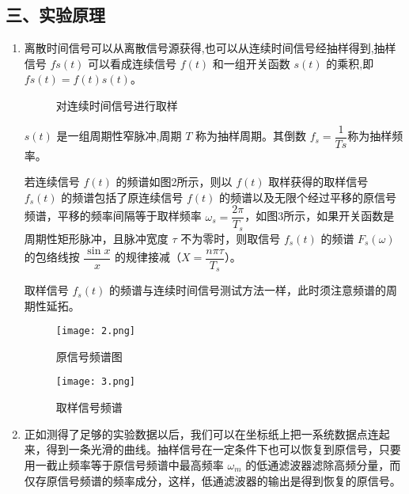 \documentclass[dvipsnames, svgnames,a4paper,11pt]{article}
\begin{document}
\subsection*{三、实验原理}
\begin{enumerate}
  \item 离散时间信号可以从离散信号源获得,也可以从连续时间信号经抽样得到,抽样信号 $fs(t)$ 可以看成连续信号 $f(t)$ 和一组开关函数 $s(t)$ 的乘积,即 $fs(t)= f(t) s(t)$。
  
  \begin{figure}[htbp]
    \centering
    \caption{对连续时间信号进行取样}
  \end{figure}


  $s(t)$ 是一组周期性窄脉冲,周期 $T$ 称为抽样周期。其倒数 $f_s = \dfrac{1}{Ts}$称为抽样频率。
  
  若连续信号 $f(t)$ 的频谱如图2所示，则以 $f(t)$ 取样获得的取样信号 $f_s(t)$ 的频谱包括了原连续信号 $f(t)$ 的频谱以及无限个经过平移的原信号频谱，平移的频率间隔等于取样频率 $\omega_s = \dfrac{2\pi}{T_s}$，如图3所示，如果开关函数是周期性矩形脉冲，且脉冲宽度 $\tau$ 不为零时，则取信号 $f_s(t)$ 的频谱 $F_s(\omega)$ 的包络线按 $\dfrac{\sin x}{x}$ 的规律接减（$X = \dfrac{n\pi \tau}{T_s}$）。
  
  取样信号 $f_s(t)$ 的频谱与连续时间信号测试方法一样，此时须注意频谱的周期性延拓。
  
  \begin{figure}[htbp]
    \centering
    \begin{minipage}[t]{0.48\textwidth}
    \centering
    \texttt{[image: 2.png]}
    \caption{原信号频谱图}
    \end{minipage}
    \begin{minipage}[t]{0.48\textwidth}
    \centering
    \texttt{[image: 3.png]}
    \caption{取样信号频谱}
    \end{minipage}
  \end{figure}
    


  \item 正如测得了足够的实验数据以后，我们可以在坐标纸上把一系统数据点连起来，得到一条光滑的曲线。抽样信号在一定条件下也可以恢复到原信号，只要用一截止频率等于原信号频谱中最高频率 $\omega_m$ 的低通滤波器滤除高频分量，而仅存原信号频谱的频率成分，这样，低通滤波器的输出是得到恢复的原信号。
  

\end{enumerate}
\end{document}
